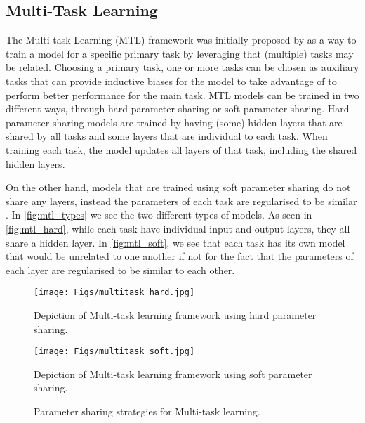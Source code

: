 \subsection{Multi-Task Learning}
The Multi-task Learning (MTL) framework was initially proposed by \citet{Caruana:1993} as a way to train a model for a specific primary task by leveraging that (multiple) tasks may be related.
Choosing a primary task, one or more tasks can be chosen as auxiliary tasks that can provide inductive biases for the model to take advantage of to perform better performance for the main task.
MTL models can be trained in two different ways, through hard parameter sharing or soft parameter sharing.
Hard parameter sharing models are trained by having (some) hidden layers that are shared by all tasks and some layers that are individual to each task.
When training each task, the model updates all layers of that task, including the shared hidden layers.

On the other hand, models that are trained using soft parameter sharing do not share any layers, instead the parameters of each task are regularised to be similar \citep{Duong:2015}.
In \autoref{fig:mtl_types} we see the two different types of models.
As seen in \autoref{fig:mtl_hard}, while each task have individual input and output layers, they all share a hidden layer.
In \autoref{fig:mtl_soft}, we see that each task has its own model that would be unrelated to one another if not for the fact that the parameters of each layer are regularised to be similar to each other.

\begin{figure}
 \centering
 \begin{minipage}{0.5\linewidth}
   \centering
   \texttt{[image: Figs/multitask\_hard.jpg]}
   \caption{Depiction of Multi-task learning framework using hard parameter sharing.}
   \label{fig:mtl_hard}
 \end{minipage}
 \begin{minipage}{0.5\linewidth}
   \centering
    \texttt{[image: Figs/multitask\_soft.jpg]}
   \caption{Depiction of Multi-task learning framework using soft parameter sharing.}
   \label{fig:mtl_soft}
 \end{minipage}
 \caption{Parameter sharing strategies for Multi-task learning.}
 \label{fig:mtl_types}
\end{figure}

